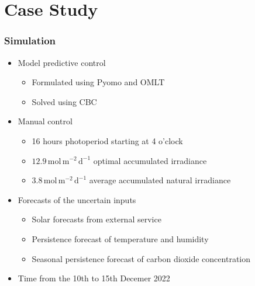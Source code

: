 
\section{Case Study}


\begin{frame}
    \frametitle{Simulation}
    
    \begin{itemize}
        \item Model predictive control
        \begin{itemize}
            \item Formulated using Pyomo and OMLT
            \item Solved using CBC 
        \end{itemize}
        \item Manual control
        \begin{itemize}
            \item 16 hours photoperiod starting at 4 o'clock
            \item $12.9 \, \mathrm{mol} \, \mathrm{m}^{-2} \, \mathrm{d}^{-1}$ optimal accumulated irradiance
            \item $3.8 \, \mathrm{mol} \, \mathrm{m}^{-2} \, \mathrm{d}^{-1}$ average accumulated natural irradiance 
        \end{itemize}
        \item Forecasts of the uncertain inputs
        \begin{itemize}
            \item Solar forecasts from external service
            \item Persistence forecast of temperature and humidity
            \item Seasonal persistence forecast of carbon dioxide concentration 
        \end{itemize}
        \item Time from the 10th to 15th Decemer 2022
    \end{itemize}
\end{frame}

